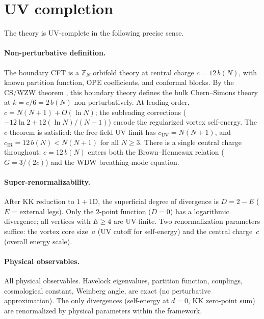 \section{UV completion}
\label{sec:uv}

The theory is UV-complete in the following precise sense.

\paragraph{Non-perturbative definition.}
The boundary CFT is a $\mathbb{Z}_N$ orbifold theory at
central charge $c = 12\,b(N)$, with
known partition function, OPE coefficients, and conformal blocks.
By the CS/WZW theorem \citep{Witten1988},
this boundary theory defines the bulk Chern--Simons theory
at $k = c/6 = 2\,b(N)$ non-perturbatively.
At leading order, $c = N(N{+}1) + O(\ln N)$; the
subleading corrections ($-12\ln 2 + 12(\ln N)/(N{-}1)$) encode
the regularized vortex self-energy.
The $c$-theorem is satisfied: the free-field UV limit
has $c_{\mathrm{UV}} = N(N{+}1)$, and $c_{\mathrm{IR}} = 12\,b(N)
< N(N{+}1)$ for all $N \ge 3$.
There is a single central charge throughout: $c = 12\,b(N)$
enters both the Brown--Henneaux relation ($G = 3/(2c)$)
and the WDW breathing-mode equation.

\paragraph{Super-renormalizability.}
After KK reduction to $1{+}1$D, the superficial degree of divergence
is $D = 2 - E$ ($E$ = external legs).
Only the $2$-point function ($D = 0$) has a logarithmic divergence;
all vertices with $E \ge 4$ are UV-finite.
Two renormalization parameters suffice: the vortex core size~$a$
(UV cutoff for self-energy) and the central charge~$c$ (overall
energy scale).

\paragraph{Physical observables.}
All physical observables. Havelock eigenvalues, partition function,
couplings, cosmological constant, Weinberg angle, are
exact (no perturbative approximation).
The only divergences (self-energy at $d = 0$, KK zero-point sum)
are renormalized by physical parameters within the framework.

